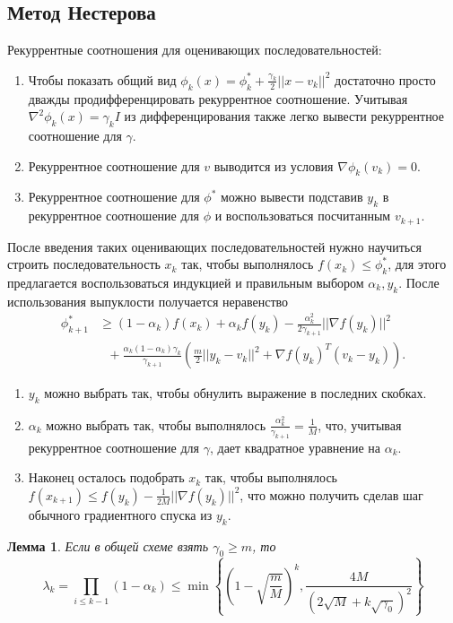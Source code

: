 \documentclass[10pt,a4paper]{article}
\newtheorem{lemma_ru}{Лемма}[section]
\begin{document}
\subsection{Метод Нестерова}
Рекуррентные соотношения для оценивающих последовательностей:
\begin{enumerate}
\item Чтобы показать общий вид $\phi_k(x)=\phi_k^*+\frac{\gamma_k}{2}||x-v_k||^2$ достаточно просто дважды продифференцировать рекуррентное соотношение. Учитывая $\nabla^2\phi_k(x)=\gamma_kI$ из дифференцирования также легко вывести рекуррентное соотношение для $\gamma$.
\item Рекуррентное соотношение для $v$ выводится из условия $\nabla \phi_k(v_k)=0$.
\item Рекуррентное соотношение для $\phi^*$ можно вывести подставив $y_k$ в рекуррентное соотношение для $\phi$ и воспользоваться посчитанным $v_{k+1}$.
\end{enumerate}
После введения таких оценивающих последовательностей нужно научиться строить последовательность $x_k$ так, чтобы выполнялось $f(x_k)\leq \phi^*_k$, для этого предлагается воспользоваться индукцией и правильным выбором $\alpha_k, y_k$. После использования выпуклости получается неравенство
\begin{align*}
\phi_{k+1}^*&\geq(1-\alpha_k)f(x_k)+\alpha_kf(y_k)-\frac{\alpha_k^2}{2\gamma_{k+1}}||\nabla f(y_k)||^2\\
&~~~+\frac{\alpha_k(1-\alpha_k)\gamma_k}{\gamma_{k+1}}
\left(\frac{m}{2}||y_k-v_k||^2+\nabla f(y_k)^T(v_k-y_k)\right).
\end{align*}

\begin{enumerate}
\item $y_k$ можно выбрать так, чтобы обнулить выражение в последних скобках.
\item $\alpha_{k}$ можно выбрать так, чтобы выполнялось $\frac{\alpha_k^2}{\gamma_{k+1}}=\frac{1}{M}$, что, учитывая рекуррентное соотношение для $\gamma$,  дает квадратное уравнение на $\alpha_k$.
\item Наконец осталось подобрать $x_k$ так, чтобы выполнялось $f(x_{k+1})\leq f(y_k)-\frac{1}{2M}||\nabla f(y_k)||^2$, что можно получить сделав шаг обычного градиентного спуска из $y_k$.
\end{enumerate}

\begin{lemma_ru}
Если в общей схеме взять $\gamma_0\geq m$, то 
$$
\lambda_k=\prod_{i\leq k-1}(1-\alpha_k)\leq \min\left\{\left(1-\sqrt{\frac{m}{M}}\right)^k, \frac{4M}{(2\sqrt{M}+k\sqrt{\gamma_0})^2}\right\}
$$
\end{lemma_ru}
\end{document}
